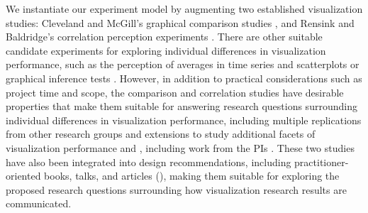 \documentclass[11pt]{article}
\begin{document}
We instantiate our experiment model by augmenting two established visualization studies: Cleveland and McGill's graphical comparison studies \cite{cleveland1984graphical}, and Rensink and Baldridge's correlation perception experiments \cite{rensink2010perception}.
There are other suitable candidate experiments for exploring individual differences in visualization performance, such as the perception of averages in time series and scatterplots \cite{gleicher2013perception, correll2012comparing} or graphical inference tests \cite{wickham2010graphical, hofmann2012graphical, majumder2013validation, zhao2013mind, vanderplas2016spatial, beecham2017map}.
However, in addition to practical considerations such as project time and scope, the comparison and correlation studies have desirable properties that make them suitable for answering research questions surrounding individual differences in visualization performance, including multiple replications from other research groups and extensions to study additional facets of visualization performance \eg \cite{hullman2011impact, talbot2014four, kong2010perceptual} and \cite{rensink2016entropy, rensink2016nature, elliott2015interference, beecham2017map}, including work from the PIs \cite{harrison2014ranking, harrison2013influencing, kay2016beyond}.
These two studies have also been integrated into design recommendations, including practitioner-oriented books, talks, and articles (\eg \cite{berinato2016good, kirk2012data, elliott2016studies, yau2011visualize}), making them suitable for exploring the proposed research questions surrounding how visualization research results are communicated.
\end{document}
